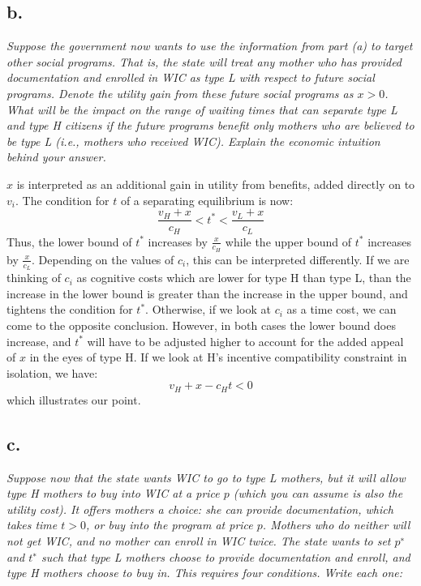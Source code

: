 \documentclass[
]{article}
\begin{document}
\hypertarget{b.-1}{%
\subsection{b.}\label{b.-1}}

\textit{Suppose the government now wants to use the information from part (a) to target other social programs. That is, the state will treat any mother who has provided documentation and enrolled in WIC as type L with respect to future social programs. Denote the utility gain from these future social programs as $x > 0$. What will be the impact on the range of waiting times that can separate type L and type H citizens if the future programs benefit only mothers who are believed to be type L (i.e., mothers who received WIC). Explain the economic intuition behind your answer.}

\(x\) is interpreted as an additional gain in utility from benefits,
added directly on to \(v_i\). The condition for \(t\) of a separating
equilibrium is now: \[\frac{v_H + x}{c_H} < t^* < \frac{v_L + x}{c_L}\]
Thus, the lower bound of \(t^*\) increases by \(\frac{x}{c_H}\) while
the upper bound of \(t^*\) increases by \(\frac{x}{c_L}\). Depending on
the values of \(c_i\), this can be interpreted differently. If we are
thinking of \(c_i\) as cognitive costs which are lower for type H than
type L, than the increase in the lower bound is greater than the
increase in the upper bound, and tightens the condition for \(t^*\).
Otherwise, if we look at \(c_i\) as a time cost, we can come to the
opposite conclusion. However, in both cases the lower bound does
increase, and \(t^*\) will have to be adjusted higher to account for the
added appeal of \(x\) in the eyes of type H. If we look at H's incentive
compatibility constraint in isolation, we have: \[v_H + x - c_H t < 0\]
which illustrates our point.

\hypertarget{c.-1}{%
\subsection{c.~}\label{c.-1}}

\textit{Suppose now that the state wants WIC to go to type L mothers, but it will allow type H mothers to buy into WIC at a price $p$ (which you can assume is also the utility cost). It offers mothers a choice: she can provide documentation, which takes time $t > 0$, or buy into the program at price $p$. Mothers who do neither will not get WIC, and no mother can enroll in WIC twice. The state wants to set $p^∗$ and $t^∗$ such that type L mothers choose to provide documentation and enroll, and type H mothers choose to buy in. This requires four conditions. Write each one:}
\end{document}
